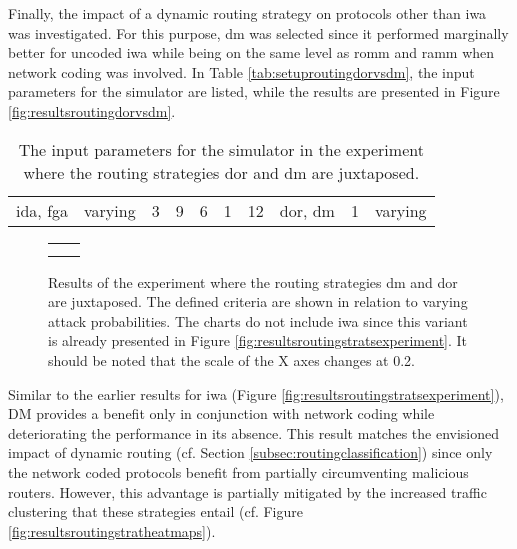 Finally, the impact of a dynamic routing strategy on protocols other than \gls{iwa} was investigated. For this purpose, \gls{dm} was selected since it
performed marginally better for uncoded \gls{iwa} while being on the same level as \gls{romm} and \gls{ramm} when network coding was involved. In
Table \vref{tab:setuproutingdorvsdm}, the input parameters for the simulator are listed, while the results are presented in Figure
\vref{fig:resultsroutingdorvsdm}.

\begin{table}
    \centering
    \begin{tabulary}{\textwidth}{C|C|C|C|C|C|C|C|C|C}
        \pProtVar{} & \pNCMode{} & \pEncMods{} & \pAuthMods{} & \pRQSize{} & \pARQLimit{} & \pARQTimeout{} & \pRStrat{} & \pAttackerSet{} & \pAttackProb{} \\\hline
        \gls{ida}, \gls{fga} & varying & 3 & 9 & 6 & 1 & 12 & \gls{dor}, \gls{dm} & 1 & varying \\
    \end{tabulary}
    \caption[Input parameters for comparing DOR and DM]{The input parameters for the simulator in the experiment where the routing strategies
    \gls{dor} and \gls{dm} are juxtaposed.}
    \label{tab:setuproutingdorvsdm}
\end{table}

\begin{figure}
    \centering
    \begin{tabular}{cc}
         &  \\
         & 
    \end{tabular}
    \caption[Results for the DOR and DM comparison]{Results of the experiment where the routing strategies \gls{dm} and \gls{dor} are juxtaposed. The
    defined criteria are shown in relation to varying attack probabilities. The charts do not include \gls{iwa} since this variant is already
    presented in Figure \ref{fig:resultsroutingstratsexperiment}. It should be noted that the scale of the X axes changes at 0.2.}
    \label{fig:resultsroutingdorvsdm}
\end{figure}

Similar to the earlier results for \gls{iwa} (Figure \ref{fig:resultsroutingstratsexperiment}), DM provides a benefit only in conjunction with network
coding while deteriorating the performance in its absence. This result matches the envisioned impact of dynamic routing (cf. Section
\ref{subsec:routingclassification}) since only the network coded protocols benefit from partially circumventing malicious routers. However, this
advantage is partially mitigated by the increased traffic clustering that these strategies entail (cf. Figure \ref{fig:resultsroutingstratheatmaps}).

